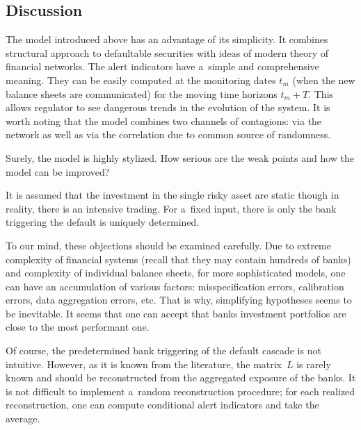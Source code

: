 \begin{multicols}{2}
\vspace*{-12pt}

\subsection {Discussion}

\vspace*{-1pt}

\noindent
The model introduced above has an advantage of its simplicity. It combines 
structural approach to defaultable 
securities with ideas of modern theory of financial networks.  The alert 
indicators have a~simple and comprehensive meaning. They can be easily computed 
at the monitoring dates $t_m$ (when the new  balance sheets are communicated)  
for the moving time horizons $t_m+T$. This allows regulator to see dangerous 
trends in the evolution of the system. It is worth noting that the 
model combines two channels of contagions: via the network as well as via the 
correlation due to common source of randomness.

Surely, the model is highly stylized. How serious are the weak points and how 
the model can be improved? 

 It is assumed that the investment in the single risky asset are static 
though in reality, there is an intensive trading. 
For a~fixed input, there is only  the bank triggering the default is uniquely 
determined. 

To our mind, these objections should be examined carefully. Due to extreme 
complexity of  financial systems (recall that they may contain hundreds of 
banks) and complexity of individual  balance sheets, for more sophisticated 
models, one can have an accumulation of various factors: misspecification errors, 
calibration errors,  data aggregation errors, etc.   That is why, simplifying 
hypotheses seems to be inevitable. It seems that one  can accept  that banks 
investment portfolios are close to the most performant one.  
{

}

Of course, the predetermined bank triggering  of the default cascade is not 
intuitive. However, as it is known from the literature, 
the matrix~$L$ is rarely known and should be reconstructed from the aggregated 
exposure of the banks. It is not difficult to  implement a~random reconstruction 
procedure;  for each realized reconstruction, one can compute conditional alert 
indicators and take the average. 
  



\end{multicols}
